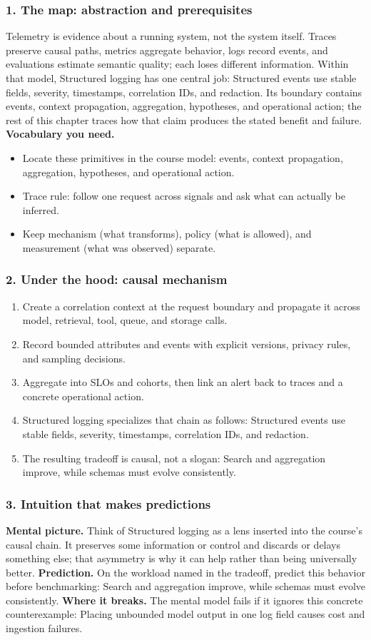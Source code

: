 \subsubsection*{1. The map: abstraction and prerequisites}
Telemetry is evidence about a running system, not the system itself. Traces preserve causal paths, metrics aggregate behavior, logs record events, and evaluations estimate semantic quality; each loses different information.
Within that model, Structured logging has one central job: Structured events use stable fields, severity, timestamps, correlation IDs, and redaction. Its boundary contains events, context propagation, aggregation, hypotheses, and operational action; the rest of this chapter traces how that claim produces the stated benefit and failure.
\textbf{Vocabulary you need.}\begin{itemize}
\item Locate these primitives in the course model: events, context propagation, aggregation, hypotheses, and operational action.
\item Trace rule: follow one request across signals and ask what can actually be inferred.
\item Keep mechanism (what transforms), policy (what is allowed), and measurement (what was observed) separate.
\end{itemize}
\subsubsection*{2. Under the hood: causal mechanism}\begin{enumerate}
\item Create a correlation context at the request boundary and propagate it across model, retrieval, tool, queue, and storage calls.
\item Record bounded attributes and events with explicit versions, privacy rules, and sampling decisions.
\item Aggregate into SLOs and cohorts, then link an alert back to traces and a concrete operational action.
\item Structured logging specializes that chain as follows: Structured events use stable fields, severity, timestamps, correlation IDs, and redaction.
\item The resulting tradeoff is causal, not a slogan: Search and aggregation improve, while schemas must evolve consistently.
\end{enumerate}
\subsubsection*{3. Intuition that makes predictions}
\textbf{Mental picture.} Think of Structured logging as a lens inserted into the course's causal chain. It preserves some information or control and discards or delays something else; that asymmetry is why it can help rather than being universally better.
\textbf{Prediction.} On the workload named in the tradeoff, predict this behavior before benchmarking: Search and aggregation improve, while schemas must evolve consistently.
\textbf{Where it breaks.} The mental model fails if it ignores this concrete counterexample: Placing unbounded model output in one log field causes cost and ingestion failures.
